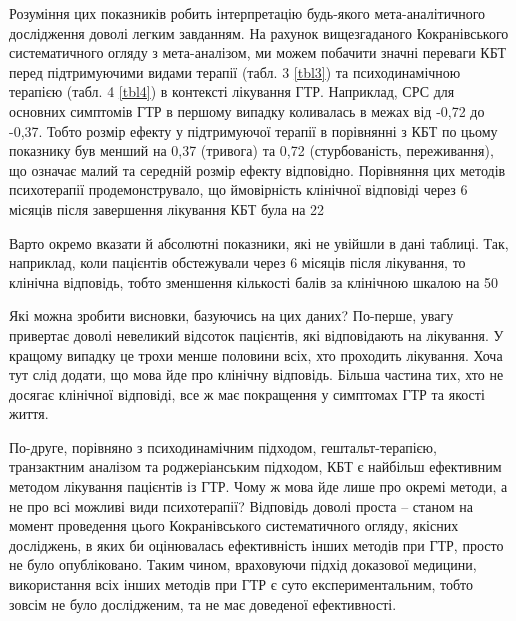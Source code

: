 \documentclass[twocolumn]{article}
\begin{document}
\par Розуміння цих показників робить інтерпретацію будь-якого мета-аналітичного дослідження доволі легким завданням. На рахунок вищезгаданого Кокранівського систематичного огляду з мета-аналізом, ми можем побачити значні переваги КБТ перед підтримуючими видами терапії (табл. 3 \ref{tbl3}) та психодинамічною терапією (табл. 4 \ref{tbl4}) в контексті лікування ГТР. Наприклад, СРС для основних симптомів ГТР в першому випадку коливалась в межах від -0,72 до -0,37. Тобто розмір ефекту у підтримуючої терапії в порівнянні з КБТ по цьому показнику був менший на 0,37 (тривога) та  0,72 (стурбованість, переживання), що означає малий та середній розмір ефекту відповідно. Порівняння цих методів психотерапії продемонструвало, що ймовірність клінічної відповіді через 6 місяців після завершення лікування КБТ була на 22%
\par Варто окремо вказати й абсолютні показники, які не увійшли в дані таблиці. Так, наприклад, коли пацієнтів обстежували через 6 місяців після лікування, то клінічна відповідь, тобто зменшення кількості балів за клінічною шкалою на 50%
\par Які можна зробити висновки, базуючись на цих даних? По-перше, увагу привертає доволі невеликий відсоток пацієнтів, які відповідають на лікування. У кращому випадку це трохи менше половини всіх, хто проходить лікування. Хоча тут слід додати, що мова йде про клінічну відповідь. Більша частина тих, хто не досягає клінічної відповіді, все ж має покращення у симптомах ГТР та якості життя.
\par По-друге, порівняно з психодинамічним підходом, гештальт-терапією, транзактним аналізом та роджеріанським підходом, КБТ є найбільш ефективним методом лікування пацієнтів із ГТР. Чому ж мова йде лише про окремі методи, а не про всі можливі види психотерапії? Відповідь доволі проста – станом на момент проведення цього Кокранівського систематичного огляду, якісних досліджень, в яких би оцінювалась ефективність інших методів при ГТР, просто не було опубліковано. Таким чином, враховуючи підхід доказової медицини, використання всіх інших методів при ГТР є суто експериментальним, тобто зовсім не було дослідженим, та не має доведеної ефективності.
\end{document}
